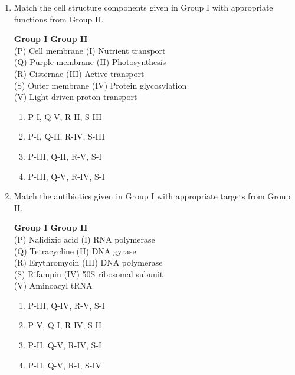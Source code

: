 \documentclass[journal,12pt,onecolumn]{IEEEtran}
\begin{document}
\begin{enumerate}[label=\arabic*.,resume]
\item Match the cell structure components given in Group I with appropriate functions from Group II.

\textbf{Group I} \hspace{2cm} \textbf{Group II} \\
(P) Cell membrane \hspace{2.5cm} (I) Nutrient transport \\
(Q) Purple membrane \hspace{2.5cm} (II) Photosynthesis \\
(R) Cisternae \hspace{3.1cm} (III) Active transport \\
(S) Outer membrane \hspace{2.5cm} (IV) Protein glycosylation \\
\hspace{2.4cm} \hspace{3cm} (V) Light-driven proton transport

\begin{multicols}{2}
\begin{enumerate}[label=(\Alph*)]
\item P-I, Q-V, R-II, S-III
\item P-I, Q-II, R-IV, S-III
\item P-III, Q-II, R-V, S-I
\item P-III, Q-V, R-IV, S-I
\end{enumerate}
\end{multicols}

\item Match the antibiotics given in Group I with appropriate targets from Group II.

\textbf{Group I} \hspace{2cm} \textbf{Group II} \\
(P) Nalidixic acid \hspace{2.5cm} (I) RNA polymerase \\
(Q) Tetracycline \hspace{3cm} (II) DNA gyrase \\
(R) Erythromycin \hspace{2.3cm} (III) DNA polymerase \\
(S) Rifampin \hspace{3.2cm} (IV) 50S ribosomal subunit \\
\hspace{3.3cm} \hspace{3cm} (V) Aminoacyl tRNA

\begin{multicols}{2}
\begin{enumerate}[label=(\Alph*)]
\item P-III, Q-IV, R-V, S-I
\item P-V, Q-I, R-IV, S-II
\item P-II, Q-V, R-IV, S-I
\item P-II, Q-V, R-I, S-IV
\end{enumerate}
\end{multicols}

\end{enumerate}
\end{document}
